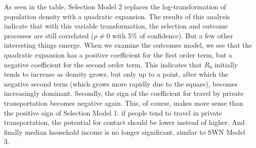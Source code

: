 \documentclass[]{elsarticle} %
\begin{document}
As seen in the table, Selection Model 2 replaces the log-transformation
of population density with a quadratic expansion. The results of this
analysis indicate that with this variable transformation, the selection
and outcome processes are still correlated (\(\rho\ne0\) with 5\% of
confidence). But a few other interesting things emerge. When we examine
the outcomes model, we see that the quadratic expansion has a positive
coefficient for the first order term, but a negative coefficient for the
second order term. This indicates that \(R_0\) initially tends to
increase as density grows, but only up to a point, after which the
negative second term (which grows more rapidly due to the square),
becomes increasingly dominant. Secondly, the sign of the coefficient for
travel by private transportation becomes negative again. This, of
course, makes more sense than the positive sign of Selection Model 1: if
people tend to travel in private transportation, the potential for
contact should be lower instead of higher. And finally median household
income is no longer significant, similar to SWN Model 3.
\end{document}
